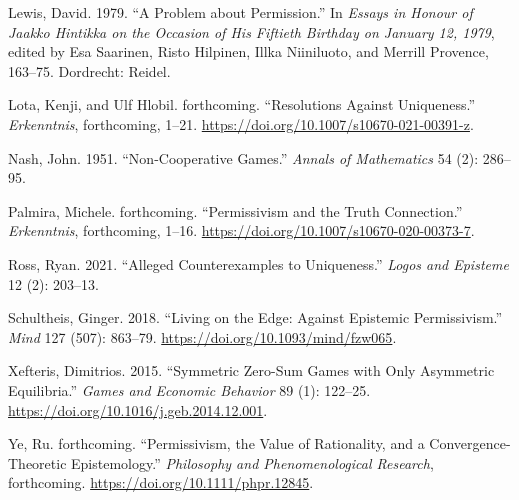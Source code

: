 \documentclass[
  11pt,
]{article}
\newlength{\cslhangindent}
\newlength{\cslentryspacingunit} %
\newenvironment{CSLReferences}[2] %
 {%
  \setlength{\parindent}{0pt}
  \ifodd #1
  \let\oldpar\par
  \def\par{\hangindent=\cslhangindent\oldpar}
  \fi
  \setlength{\parskip}{#2\cslentryspacingunit}
 }%
 {}
\begin{document}
\begin{CSLReferences}{1}{0}
\leavevmode{}%
Lewis, David. 1979. {``A Problem about Permission.''} In \emph{Essays in Honour of {J}aakko Hintikka on the Occasion of His Fiftieth Birthday on {J}anuary 12, 1979}, edited by Esa Saarinen, Risto Hilpinen, Illka Niiniluoto, and Merrill Provence, 163--75. Dordrecht: Reidel.

\leavevmode{}%
Lota, Kenji, and Ulf Hlobil. forthcoming. {``Resolutions Against Uniqueness.''} \emph{Erkenntnis}, forthcoming, 1--21. \url{https://doi.org/10.1007/s10670-021-00391-z}.

\leavevmode{}%
Nash, John. 1951. {``Non-Cooperative Games.''} \emph{Annals of Mathematics} 54 (2): 286--95.

\leavevmode{}%
Palmira, Michele. forthcoming. {``Permissivism and the Truth Connection.''} \emph{Erkenntnis}, forthcoming, 1--16. \url{https://doi.org/10.1007/s10670-020-00373-7}.

\leavevmode{}%
Ross, Ryan. 2021. {``Alleged Counterexamples to Uniqueness.''} \emph{Logos and Episteme} 12 (2): 203--13.

\leavevmode{}%
Schultheis, Ginger. 2018. {``Living on the Edge: Against Epistemic Permissivism.''} \emph{Mind} 127 (507): 863--79. \url{https://doi.org/10.1093/mind/fzw065}.

\leavevmode{}%
Xefteris, Dimitrios. 2015. {``Symmetric Zero-Sum Games with Only Asymmetric Equilibria.''} \emph{Games and Economic Behavior} 89 (1): 122--25. \url{https://doi.org/10.1016/j.geb.2014.12.001}.

\leavevmode{}%
Ye, Ru. forthcoming. {``Permissivism, the Value of Rationality, and a Convergence-Theoretic Epistemology.''} \emph{Philosophy and Phenomenological Research}, forthcoming. \url{https://doi.org/10.1111/phpr.12845}.

\end{CSLReferences}
\end{document}
